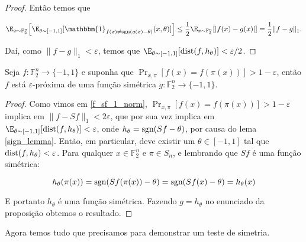 \begin{proof}
Então temos que

\begin{equation*}
	\E_{x \sim \mathbb{F}_{2}^{n}} \Big[ \E_{\theta \sim [-1, 1]}[\mathbbm{1}_{f(x) \neq \sgn(g(x) - \theta)}(x, \theta)] \Big] \leq \frac{1}{2}\E_{x \sim \mathbb{F}_{2}^{n}}[\lvert f(x) - g(x) \lvert] = \frac{1}{2} \lVert f - g \rVert_{1}.
\end{equation*}

Daí, como $\lVert f - g \rVert_{1} < \varepsilon$, temos que $\E_{\theta \sim [-1, 1]}[\dist(f, h_{\theta})] < \varepsilon/2$.

\end{proof}

\begin{prop} \label{close_to_symmetric}

Seja $f: \mathbb{F}_{2}^{n} \to \{-1, 1\}$ e suponha que $\Pr_{x, \pi}[f(x) = f(\pi(x))] > 1 - \varepsilon$, então $f$ está $\varepsilon$-próxima de uma função simétrica $g: \mathbb{F}_{2}^{n} \to \{-1, 1\}$.

\end{prop}

\begin{proof}

Como vimos em \ref{f_sf_1_norm}, $\Pr_{x, \pi}[f(x) = f(\pi(x))] > 1 - \varepsilon$ implica em $\lVert f - Sf \rVert_{1} < 2\varepsilon$, que por sua vez implica em $\E_{\theta \sim [-1, 1]}[\dist(f, h_{\theta})] < \varepsilon$, onde $h_{\theta} = \text{sgn}(Sf - \theta)$, por causa do lema \ref{sign_lemma}. Então, em particular, deve existir um $\theta \in [-1, 1]$ tal que $\text{dist}(f, h_{\theta}) < \varepsilon$. Para qualquer $x \in \mathbb{F}_{2}^{n}$ e $\pi \in S_{n}$, e lembrando que $Sf$ é uma função simétrica:

\begin{equation*}
	h_{\theta}(\pi(x)) = \text{sgn}(Sf(\pi(x)) - \theta) = \text{sgn}(Sf(x) - \theta) = h_{\theta}(x)
\end{equation*}

E portanto $h_{\theta}$ é uma função simétrica. Fazendo $g = h_{\theta}$ no enunciado da proposição obtemos o resultado.

\end{proof}

Agora temos tudo que precisamos para demonstrar um teste de simetria.

